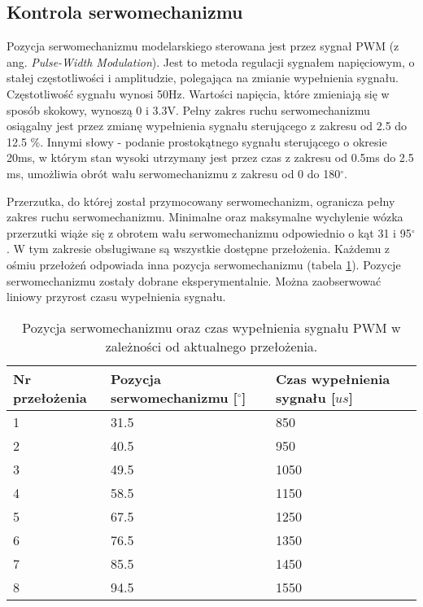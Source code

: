 \subsection{Kontrola serwomechanizmu}
Pozycja serwomechanizmu modelarskiego sterowana jest przez sygnał PWM (z ang. {\em Pulse-Width Modulation}). Jest to metoda regulacji sygnałem napięciowym, o stałej częstotliwości i amplitudzie, polegająca na zmianie wypełnienia sygnału. Częstotliwość sygnału wynosi 50Hz. Wartości napięcia, które zmieniają się w sposób skokowy, wynoszą 0 i 3.3V. Pełny zakres ruchu serwomechanizmu osiągalny jest przez zmianę wypełnienia sygnału sterującego z zakresu od 2.5 do 12.5 \%. Innymi słowy - podanie prostokątnego sygnału sterującego o okresie 20ms, w którym stan wysoki utrzymany jest przez czas z zakresu od 0.5ms do 2.5 ms, umożliwia obrót wału serwomechanizmu z zakresu od 0 do 180$^{\circ}$.

Przerzutka, do której został przymocowany serwomechanizm, ogranicza pełny zakres ruchu serwomechanizmu. Minimalne oraz maksymalne wychylenie wózka przerzutki wiąże się z obrotem wału serwomechanizmu odpowiednio o kąt 31 i 95$^{\circ}$. W tym zakresie obsługiwane są wszystkie dostępne przełożenia. Każdemu z ośmiu przełożeń odpowiada inna pozycja serwomechanizmu (tabela \ref{tab:przelozenia}). Pozycje serwomechanizmu zostały dobrane eksperymentalnie. Można zaobserwować liniowy przyrost czasu wypełnienia sygnału. 
\begin{table}[h]
    \caption{Pozycja serwomechanizmu oraz czas wypełnienia sygnału PWM w zależności od aktualnego przełożenia.}
    \begin{center}
		\label{tab:przelozenia}
		\begin{tabular}{|m{2.3cm}|m{3cm}|m{3cm}|}
			\hline
 			\textbf{Nr przełożenia} & \textbf{Pozycja serwomechanizmu [$^{\circ}$]} & \textbf{Czas wypełnienia sygnału [$us$]} \\
 			\hline
 			1 & 31.5 & 850 \\ 
 			\hline 
			2 & 40.5 & 950 \\
			\hline
			3 & 49.5 & 1050 \\  
			\hline
			4 & 58.5 & 1150 \\  
			\hline
			5 & 67.5 & 1250 \\  
			\hline
			6 & 76.5 & 1350 \\  
			\hline
			7 & 85.5 & 1450 \\  
			\hline
			8 & 94.5 & 1550 \\  
			\hline
		\end{tabular}
	\end{center}
\end{table}

